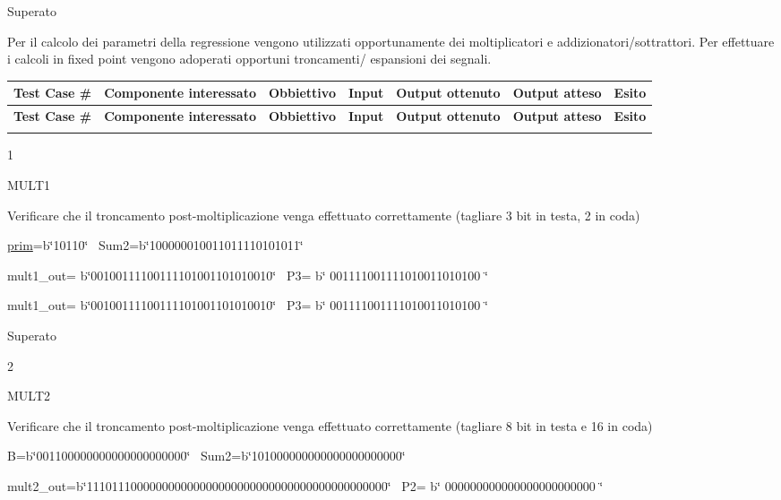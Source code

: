 Superato  

Per il calcolo dei parametri della regressione vengono utilizzati opportunamente dei moltiplicatori e addizionatori/sottrattori. Per effettuare i calcoli in fixed point vengono adoperati opportuni troncamenti/ espansioni dei segnali.  \tabulinesep=1mm
\begin{longtabu} spread 0pt [c]{*{7}{|X[-1]}|}
\hline
\rowcolor{\tableheadbgcolor}\textbf{ Test Case \# }&\textbf{ Componente interessato }&\textbf{ Obbiettivo }&\textbf{ Input }&\textbf{ Output ottenuto }&\textbf{ Output atteso }&\textbf{ Esito }\\
\endfirsthead
\hline
\endfoot
\hline
\rowcolor{\tableheadbgcolor}\textbf{ Test Case \# }&\textbf{ Componente interessato }&\textbf{ Obbiettivo }&\textbf{ Input }&\textbf{ Output ottenuto }&\textbf{ Output atteso }&\textbf{ Esito }\\
\endhead
\\
\end{longtabu}


1 

M\+U\+L\+T1 

Verificare che il troncamento post-\/moltiplicazione venga effettuato correttamente (tagliare 3 bit in testa, 2 in coda) 

\hyperlink{group___linear_regression_ga6b9afe9c48db695b7336519281c099a8}{prim}=b\char`\"{}10110\char`\"{}~\newline
 Sum2=b\char`\"{}100000010011011110101011\char`\"{}  

mult1\+\_\+out= b\char`\"{}00100111100111101001101010010\char`\"{}~\newline
 P3= b\char`\"{}   001111001111010011010100  \char`\"{} 

mult1\+\_\+out= b\char`\"{}00100111100111101001101010010\char`\"{}~\newline
 P3= b\char`\"{}   001111001111010011010100  \char`\"{} 

Superato  

2 

M\+U\+L\+T2 

Verificare che il troncamento post-\/moltiplicazione venga effettuato correttamente (tagliare 8 bit in testa e 16 in coda) 

B=b\char`\"{}001100000000000000000000\char`\"{}~\newline
 Sum2=b\char`\"{}101000000000000000000000\char`\"{}  

mult2\+\_\+out=b\char`\"{}111011100000000000000000000000000000000000000000\char`\"{}~\newline
 P2= b\char`\"{}        000000000000000000000000                \char`\"{} 

